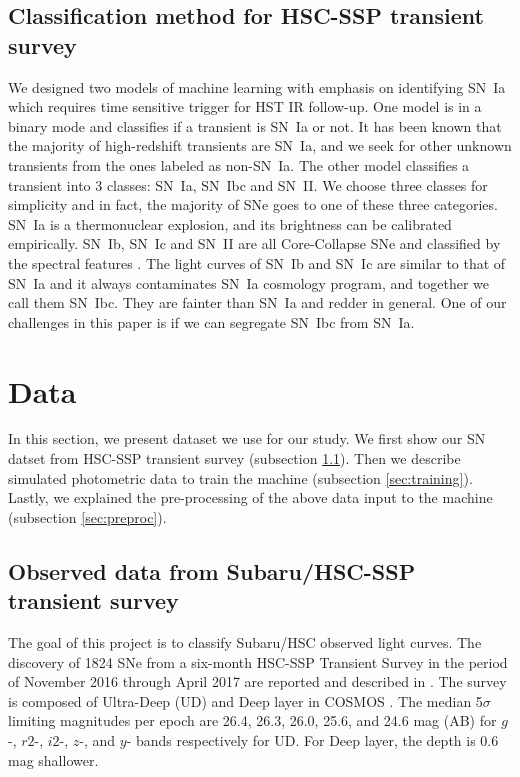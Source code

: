 \documentclass[useamsfonts]{pasj01}
\begin{document}
\subsection{Classification method for HSC-SSP transient survey}
We designed two models of machine learning with emphasis on identifying SN~Ia which requires time sensitive trigger for HST IR follow-up.
One model is in a binary mode and classifies if a transient is SN~Ia or not.
It has been known that the majority of high-redshift transients are SN~Ia, and we seek for other unknown transients from the ones labeled as non-SN~Ia.   
The other model classifies a transient into 3 classes: SN~Ia, SN~Ibc and SN~II.  
We choose three classes for simplicity and in fact, the majority of SNe goes to one of these three categories.
SN~Ia is a thermonuclear explosion, and its brightness can be calibrated empirically.
SN~Ib, SN~Ic and SN~II are all Core-Collapse SNe and classified by the spectral features \citep{filippenko97a}.
The light curves of SN~Ib and SN~Ic are similar to that of SN~Ia and it always contaminates SN~Ia cosmology program, and together we call them SN~Ibc.  They are fainter than SN~Ia and redder in general.
One of our challenges in this paper is if we can segregate SN~Ibc from SN~Ia.
%
%

\section{Data}
In this section, we present dataset we use for our study.
We first show our SN datset from HSC-SSP transient survey (subsection \ref{sec:hscdata}).
Then we describe simulated photometric data to train the machine (subsection \ref{sec:training}).
Lastly, we explained the pre-processing of the above data input to the machine (subsection \ref{sec:preproc}).

\subsection{Observed data from Subaru/HSC-SSP transient survey}
\label{sec:hscdata}
The goal of this project is to classify Subaru/HSC observed light curves. 
The discovery of 1824 SNe from a six-month HSC-SSP Transient Survey in the period of
November 2016 through April 2017 are reported and described in \citet{yasuda19a}.
The survey is composed of Ultra-Deep (UD) and Deep layer in COSMOS \citep{scoville07a}.
The median 5$\sigma$ limiting magnitudes per epoch are 26.4, 26.3, 26.0, 25.6, and 24.6 mag (AB)
for $g$-, $r2$-, $i2$-, $z$-, and $y$- bands respectively for UD. 
For Deep layer, the depth is 0.6 mag shallower.
\end{document}
